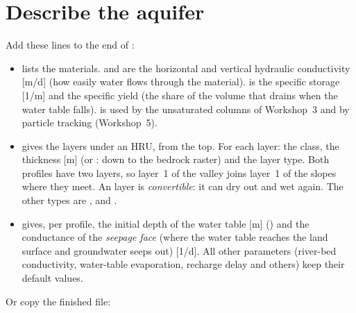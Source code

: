 \section{Describe the aquifer}

Add these lines to the end of :
\why
\begin{itemize}
\item {} lists the materials.  and  are the horizontal and vertical
  hydraulic conductivity [m/d] (how easily water flows through the material).  is the specific storage
  [1/m] and  the specific yield (the share of the volume that drains when the water table falls).
   is used by the unsaturated columns of Workshop~3 and by particle tracking (Workshop~5).
\item {} gives the layers under an HRU, from the top. For each layer: the class, the thickness [m] (or
  : down to the bedrock raster) and the layer type. Both profiles have two layers, so layer~1 of the valley
  joins layer~1 of the slopes where they meet. An  layer is \emph{convertible}: it can dry out and wet again.
  The other types are ,  and .
\item {} gives, per profile, the initial depth of the water table [m]
  () and the conductance of the \emph{seepage face} (where the water table reaches the land
  surface and groundwater seeps out) [1/d]. All other parameters (river-bed conductivity, water-table evaporation,
  recharge delay and others) keep their default values.
\end{itemize}
Or copy the finished file: 
